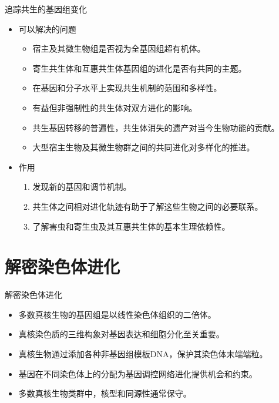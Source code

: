 \documentclass{beamer}
\begin{document}
	\begin{frame}{追踪共生的基因组变化}
		\begin{itemize}
			\item 可以解决的问题
			\begin{itemize}
			\item 宿主及其微生物组是否视为全基因组超有机体。
			\item 寄生共生体和互惠共生体基因组的进化是否有共同的主题。
			\item 在基因和分子水平上实现共生机制的范围和多样性。
			\item 有益但非强制性的共生体对双方进化的影响。
			\item 共生基因转移的普遍性，共生体消失的遗产对当今生物功能的贡献。
			\item 大型宿主生物及其微生物群之间的共同进化对多样化的推进。
			\end{itemize}

			\item 作用
			\begin{enumerate}
				\item 发现新的基因和调节机制。
				\item 共生体之间相对进化轨迹有助于了解这些生物之间的必要联系。
				\item 了解害虫和寄生虫及其互惠共生体的基本生理依赖性。
			\end{enumerate}
			
		\end{itemize}
	\end{frame}


	\section{解密染色体进化}
	\begin{frame}{解密染色体进化}
		\begin{itemize}
			\item 多数真核生物的基因组是以线性染色体组织的二倍体。
			\item 真核染色质的三维构象对基因表达和细胞分化至关重要。
			\item 真核生物通过添加各种非基因组模板DNA，保护其染色体末端端粒。
			\item 基因在不同染色体上的分配为基因调控网络进化提供机会和约束。
			\item 多数真核生物类群中，核型和同源性通常保守。
		\end{itemize}
	\end{frame}
\end{document}
